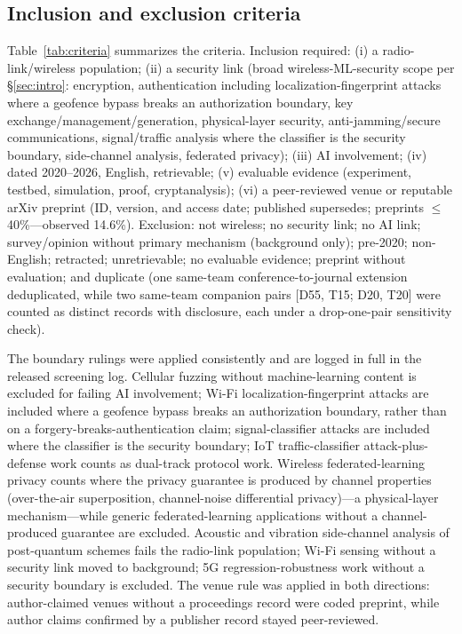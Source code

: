 \subsection{Inclusion and exclusion criteria}
Table~\ref{tab:criteria} summarizes the criteria. Inclusion required: (i) a radio-link/wireless population; (ii) a security link (broad wireless-ML-security scope per \S\ref{sec:intro}: encryption, authentication including localization-fingerprint attacks where a geofence bypass breaks an authorization boundary, key exchange/management/generation, physical-layer security, anti-jamming/secure communications, signal/traffic analysis where the classifier is the security boundary, side-channel analysis, federated privacy); (iii) AI involvement; (iv) dated 2020--2026, English, retrievable; (v) evaluable evidence (experiment, testbed, simulation, proof, cryptanalysis); (vi) a peer-reviewed venue or reputable arXiv preprint (ID, version, and access date; published supersedes; preprints $\le$40\%---observed 14.6\%). Exclusion: not wireless; no security link; no AI link; survey/opinion without primary mechanism (background only); pre-2020; non-English; retracted; unretrievable; no evaluable evidence; preprint without evaluation; and duplicate (one same-team conference-to-journal extension deduplicated, while two same-team companion pairs [D55, T15; D20, T20] were counted as distinct records with disclosure, each under a drop-one-pair sensitivity check).

The boundary rulings were applied consistently and are logged in full in the released screening log. Cellular fuzzing without machine-learning content is excluded for failing AI involvement; Wi-Fi localization-fingerprint attacks are included where a geofence bypass breaks an authorization boundary, rather than on a forgery-breaks-authentication claim; signal-classifier attacks are included where the classifier is the security boundary; IoT traffic-classifier attack-plus-defense work counts as dual-track protocol work. Wireless federated-learning privacy counts where the privacy guarantee is produced by channel properties (over-the-air superposition, channel-noise differential privacy)---a physical-layer mechanism---while generic federated-learning applications without a channel-produced guarantee are excluded. Acoustic and vibration side-channel analysis of post-quantum schemes fails the radio-link population; Wi-Fi sensing without a security link moved to background; 5G regression-robustness work without a security boundary is excluded. The venue rule was applied in both directions: author-claimed venues without a proceedings record were coded preprint, while author claims confirmed by a publisher record stayed peer-reviewed.


